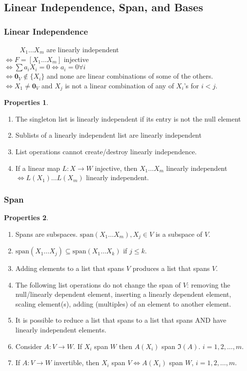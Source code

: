 \documentclass{article}
\theoremstyle{definition}
\newtheorem{prop}{Properties}[section]
\newcommand{\xpan}{\text{span}}
\begin{document}
\subsection{Linear Independence, Span, and Bases}
\subsubsection{Linear Independence}
$\,\,\,\,\,\,\,\,\,\,\,\,\,\,X_1\dots X_m$ are linearly independent\\
$\iff F = [X_1 \dots X_m]$ injective\\
$\iff \sum a_iX_i = 0 \iff a_i = 0 \forall i$\\
$\iff \mathbf{0}_V \notin \{X_i\}$ and none are linear combinations of some of the others.\\
$\iff X_1 \neq \mathbf{0}_V$ and $X_j$ is not a linear combination of any of $X_i$'s for $i < j$. 
\begin{prop}
	$\,$
	\begin{enumerate}
		\item The singleton list is linearly independent if its entry is not the null element
		\item Sublists of a linearly independent list are linearly independent
		\item List operations cannot create/destroy linearly independence. 
		\item If a linear map $L : X \rightarrow W$ injective, then $X_1\dots X_m$ linearly independent $\iff L(X_1)\dots L(X_m)$ linearly independent.  
	\end{enumerate}
\end{prop}
\subsubsection{Span}
\begin{prop}
	$\,$
	\begin{enumerate}
		\item Spans are subspaces. $\xpan(X_1\dots X_m), X_j \in V$ is a subspace of $V$.
		\item $\xpan(X_1\dots X_j) \subseteq \xpan(X_1\dots X_k)$ if $j\leq k$.
		\item Adding elements to a list that spans $V$ produces a list that spans $V$.
		\item The following list operations do not change the span of $V$: removing the null/linearly dependent element, inserting a linearly dependent element, scaling element(s), adding (multiples) of an element to another element.
		\item It is possible to reduce a list that spans to a list that spans AND have linearly independent elements.
		\item Consider $A : V \rightarrow W$. If $X_i$ span $W$ then $A(X_i)$ span $\Im(A)$. $i=1,2,\dots,m$.
		\item If $A : V \rightarrow W$ invertible, then $X_i$ span $V \iff A(X_i)$ span $W$, $i=1,2,\dots,m$. 
	\end{enumerate}
\end{prop}
\end{document}

